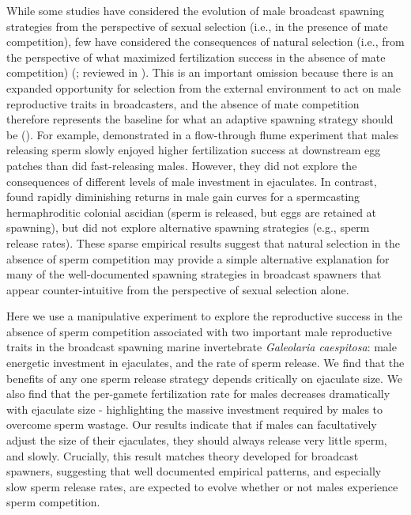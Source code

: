 \documentclass{article}
\begin{document}
While some studies have considered the evolution of male broadcast spawning strategies from the perspective of sexual selection (i.e., in the presence of mate competition), few have considered the consequences of natural selection (i.e., from the perspective of what maximized fertilization success in the absence of mate competition) (\citealt{Levitan2005}; reviewed in \citealt{LotterhosLevitan2011}). This is an important omission because there is an expanded opportunity for selection from the external environment to act on male reproductive traits in broadcasters, and the absence of mate competition therefore represents the baseline for what an adaptive spawning strategy should be (\citealt{MarshallBolton2007}). For example, \citet{MarshallBolton2007} demonstrated in a flow-through flume experiment that males releasing sperm slowly enjoyed higher fertilization success at downstream egg patches than did fast-releasing males. However, they did not explore the consequences of different levels of male investment in ejaculates. In contrast, \citet{JohnsonYund2009} found rapidly diminishing returns in male gain curves for a spermcasting hermaphroditic colonial ascidian (sperm is released, but eggs are retained at spawning), but did not explore alternative spawning strategies (e.g., sperm release rates). These sparse empirical results suggest that natural selection in the absence of sperm competition may provide a simple alternative explanation for many of the well-documented spawning strategies in broadcast spawners that appear counter-intuitive from the perspective of sexual selection alone. 

Here we use a manipulative experiment to explore the reproductive success in the absence of sperm competition associated with two important male reproductive traits in the broadcast spawning marine invertebrate \textit{Galeolaria caespitosa}: male energetic investment in ejaculates, and the rate of sperm release. We find that the benefits of any one sperm release strategy depends critically on ejaculate size. We also find that the per-gamete fertilization rate for males decreases dramatically with ejaculate size - highlighting the massive investment required by males to overcome sperm wastage. Our results indicate that if males can facultatively adjust the size of their ejaculates, they should always release very little sperm, and slowly. Crucially, this result matches theory developed for broadcast spawners, suggesting that well documented empirical patterns, and especially slow sperm release rates, are expected to evolve whether or not males experience sperm competition.
\end{document}

